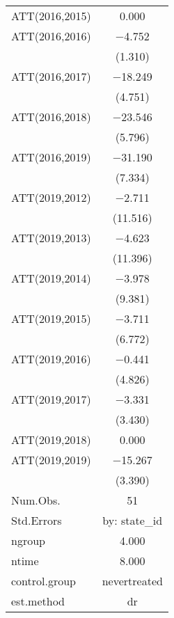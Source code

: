 \begin{table}
\begin{tabular}[t]{lc}
ATT(2016,2015) & \num{0.000}\\
ATT(2016,2016) & \num{-4.752}\\
 & (\num{1.310})\\
ATT(2016,2017) & \num{-18.249}\\
 & (\num{4.751})\\
ATT(2016,2018) & \num{-23.546}\\
 & (\num{5.796})\\
ATT(2016,2019) & \num{-31.190}\\
 & (\num{7.334})\\
ATT(2019,2012) & \num{-2.711}\\
 & (\num{11.516})\\
ATT(2019,2013) & \num{-4.623}\\
 & (\num{11.396})\\
ATT(2019,2014) & \num{-3.978}\\
 & (\num{9.381})\\
ATT(2019,2015) & \num{-3.711}\\
 & (\num{6.772})\\
ATT(2019,2016) & \num{-0.441}\\
 & (\num{4.826})\\
ATT(2019,2017) & \num{-3.331}\\
 & (\num{3.430})\\
ATT(2019,2018) & \num{0.000}\\
ATT(2019,2019) & \num{-15.267}\\
 & (\num{3.390})\\
\midrule
Num.Obs. & \num{51}\\
Std.Errors & by: state\_id\\
ngroup & \num{4.000}\\
ntime & \num{8.000}\\
control.group & nevertreated\\
est.method & dr\\
\bottomrule
\end{tabular}
\end{table}
